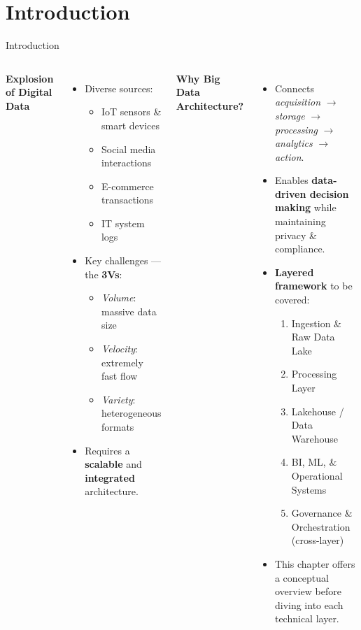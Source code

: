 \documentclass[aspectratio=169, table]{beamer}
\begin{document}
\section{Introduction}
\begin{frame}[fragile]{Introduction}
	\vspace{20pt}
	\begin{columns}[T]
		\textbf{Explosion of Digital Data}
		\begin{itemize}
			\item Diverse sources:
			\begin{itemize}
				\item IoT sensors \& smart devices
				\item Social media interactions
				\item E-commerce transactions
				\item IT system logs
			\end{itemize}
			\item Key challenges — the \textbf{3Vs}:
			\begin{itemize}
				\item \textit{Volume}: massive data size
				\item \textit{Velocity}: extremely fast flow
				\item \textit{Variety}: heterogeneous formats
			\end{itemize}
			\item Requires a \textbf{scalable} and \textbf{integrated} architecture.
		\end{itemize}
		
		\textbf{Why Big Data Architecture?}
		\begin{itemize}
			\item Connects \emph{acquisition} $\rightarrow$ \emph{storage} $\rightarrow$ \emph{processing} $\rightarrow$ \emph{analytics} $\rightarrow$ \emph{action}.
			\item Enables \textbf{data-driven decision making} while maintaining privacy \& compliance.
			\item \textbf{Layered framework} to be covered:
			\begin{enumerate}
				\item Ingestion \& Raw Data Lake
				\item Processing Layer
				\item Lakehouse / Data Warehouse
				\item BI, ML, \& Operational Systems
				\item Governance \& Orchestration (cross-layer)
			\end{enumerate}
			\item This chapter offers a conceptual overview before diving into each technical layer.
		\end{itemize}
	\end{columns}
\end{frame}
\end{document}
